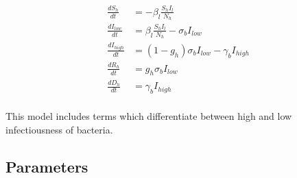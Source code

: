 \documentclass [letterpaper, 12pt] {article}
\begin{document}
\begin{align}
	\frac{dS_h}{dt}      & = -\beta_l \frac{S_h I_l}{N_h}                   \\
	\frac{dI_{low}}{dt}  & = \beta_l \frac{S_h I_l}{N_h} - \sigma_b I_{low} \\
	\frac{dI_{high}}{dt} & = (1-g_h) \sigma_b I_{low} - \gamma_b I_{high}   \\
	\frac{dR_h}{dt}      & = g_h \sigma_b I_{low}                           \\
	\frac{dD_h}{dt}      & = \gamma_b I_{high}                              \\
\end{align}

This model includes terms which differentiate between high and low infectiousness of bacteria.

\pagebreak

\subsection{Parameters}
\end{document}
